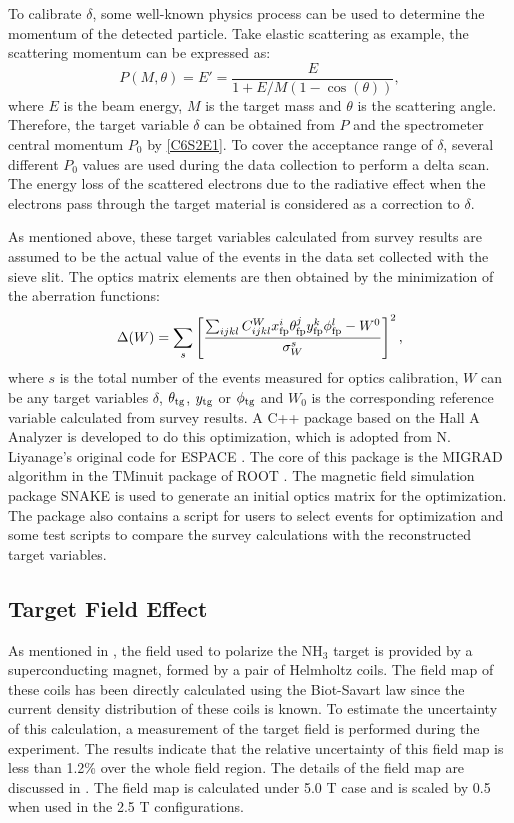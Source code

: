 To calibrate $\delta$, some well-known physics process can be used to determine the momentum of the detected particle. Take elastic scattering as example, the scattering momentum can be expressed as:
\begin{equation} \label{C6S2E10}
P(M,\theta) = E' = \frac{E}{1+E/M(1-\cos(\theta))},
\end{equation}
where $E$ is the beam energy, $M$ is the target mass and $\theta$ is the scattering angle. Therefore, the target variable $\delta$ can be obtained from $P$ and the spectrometer central momentum $P_0$ by \cref{C6S2E1}. To cover the acceptance range of $\delta$, several different $P_0$ values are used during the data collection to perform a delta scan. The energy loss of the scattered electrons due to the radiative effect when the electrons pass through the target material is considered as a correction to $\delta$.

As mentioned above, these target variables calculated from survey results are assumed to be the actual value of the events in the data set collected with the sieve slit. The optics matrix elements are then obtained by the minimization of the aberration functions:
\begin{equation} \label{C6S2E11}
\Delta (W) = \sum_s\left[\frac{\sum_{ijkl}C_{ijkl}^{W}x_{\mathrm{fp}}^i\theta_{\mathrm{fp}}^jy_{\mathrm{fp}}^k\phi_{\mathrm{fp}}^l-W^{0}}{\sigma_W^s}\right]^2,
\end{equation}
where $s$ is the total number of the events measured for optics calibration, $W$ can be any target variables $\delta$, $\theta_{\mathrm{tg}}$, $y_{\mathrm{tg}}$ or $\phi_{\mathrm{tg}}$ and $W_0$ is the corresponding reference variable calculated from survey results. A C++ package based on the Hall A Analyzer \cite{Hansen2015} is developed to do this optimization, which is adopted from N. Liyanage's original code \cite{Liyanage2002} for ESPACE \cite{ESPACE}. The core of this package is the MIGRAD algorithm in the TMinuit package of ROOT \cite{ROOT}. The magnetic field simulation package SNAKE is used to generate an initial optics matrix for the optimization. The package also contains a script for users to select events for optimization and some test scripts to compare the survey calculations with the reconstructed target variables.

\subsection{Target Field Effect}
\label{C6S2SS3}

As mentioned in , the field used to polarize the NH${}_3$ target is provided by a superconducting magnet, formed by a pair of Helmholtz coils. The field map of these coils has been directly calculated using the Biot-Savart law since the current density distribution of these coils is known. To estimate the uncertainty of this calculation, a measurement of the target field is performed during the experiment. The results indicate that the relative uncertainty of this field map is less than 1.2\% over the whole field region. The details of the field map are discussed in . The field map is calculated under 5.0 T case and is scaled by 0.5 when used in the 2.5 T configurations.

